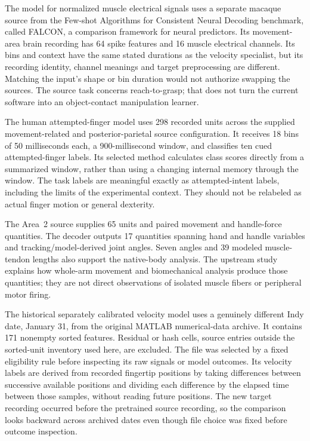 The model for normalized muscle electrical signals uses a separate macaque source from the Few-shot Algorithms for Consistent Neural Decoding benchmark, called FALCON, a comparison framework for neural predictors. Its movement-area brain recording has 64 spike features and 16 muscle electrical channels. Its bins and context have the same stated durations as the velocity specialist, but its recording identity, channel meanings and target preprocessing are different. Matching the input's shape or bin duration would not authorize swapping the sources. The source task concerns reach-to-grasp; that does not turn the current software into an object-contact manipulation learner.\cite{falcon2024}

The human attempted-finger model uses 298 recorded units across the supplied movement-related and posterior-parietal source configuration. It receives 18 bins of 50 milliseconds each, a 900-millisecond window, and classifies ten cued attempted-finger labels. Its selected method calculates class scores directly from a summarized window, rather than using a changing internal memory through the window. The task labels are meaningful exactly as attempted-intent labels, including the limits of the experimental context. They should not be relabeled as actual finger motion or general dexterity.\cite{human_fingers2023}

The Area~2 source supplies 65 units and paired movement and handle-force quantities. The decoder outputs 17 quantities spanning hand and handle variables and tracking/model-derived joint angles. Seven angles and 39 modeled muscle-tendon lengths also support the native-body analysis. The upstream study explains how whole-arm movement and biomechanical analysis produce those quantities; they are not direct observations of isolated muscle fibers or peripheral motor firing.\cite{chowdhury2020}

The historical separately calibrated velocity model uses a genuinely different Indy date, January 31, from the original MATLAB numerical-data archive. It contains 171 nonempty sorted features. Residual or hash cells, source entries outside the sorted-unit inventory used here, are excluded. The file was selected by a fixed eligibility rule before inspecting its raw signals or model outcomes. Its velocity labels are derived from recorded fingertip positions by taking differences between successive available positions and dividing each difference by the elapsed time between those samples, without reading future positions. The new target recording occurred before the pretrained source recording, so the comparison looks backward across archived dates even though file choice was fixed before outcome inspection.\cite{odoherty2020}

